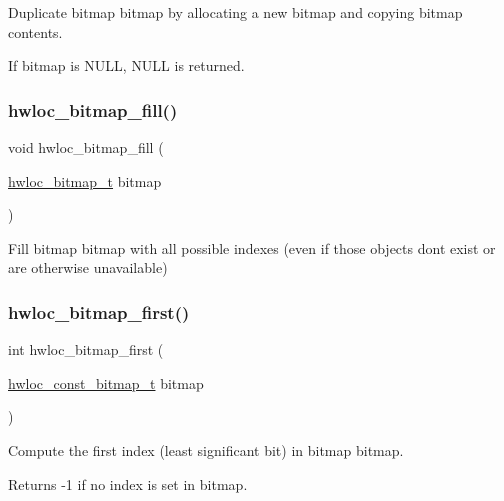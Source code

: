 Duplicate bitmap {\ttfamily bitmap} by allocating a new bitmap and copying {\ttfamily bitmap} contents. 

If {\ttfamily bitmap} is {\ttfamily N\+U\+LL}, {\ttfamily N\+U\+LL} is returned. \mbox{\label{a00205_ga07b2de8786b3cdb22f21d9dd42588275}} 
\subsubsection{\texorpdfstring{hwloc\+\_\+bitmap\+\_\+fill()}{hwloc\_bitmap\_fill()}}
{\footnotesize\ttfamily void hwloc\+\_\+bitmap\+\_\+fill (\begin{DoxyParamCaption}\item[{\hyperlink{a00205_gaa3c2bf4c776d603dcebbb61b0c923d84}{hwloc\+\_\+bitmap\+\_\+t}}]{bitmap }\end{DoxyParamCaption})}



Fill bitmap {\ttfamily bitmap} with all possible indexes (even if those objects don\textquotesingle{}t exist or are otherwise unavailable) 

\mbox{\label{a00205_ga3ec1ced43afadf8c0a7197320bc016ed}} 
\subsubsection{\texorpdfstring{hwloc\+\_\+bitmap\+\_\+first()}{hwloc\_bitmap\_first()}}
{\footnotesize\ttfamily int hwloc\+\_\+bitmap\+\_\+first (\begin{DoxyParamCaption}\item[{\hyperlink{a00205_gae991a108af01d408be2776c5b2c467b2}{hwloc\+\_\+const\+\_\+bitmap\+\_\+t}}]{bitmap }\end{DoxyParamCaption})}



Compute the first index (least significant bit) in bitmap {\ttfamily bitmap}. 

\begin{DoxyReturn}{Returns}
-\/1 if no index is set in {\ttfamily bitmap}. 
\end{DoxyReturn}
\mbox{\label{a00205_gae408841487b288e148a478ba0465c99e}} 

